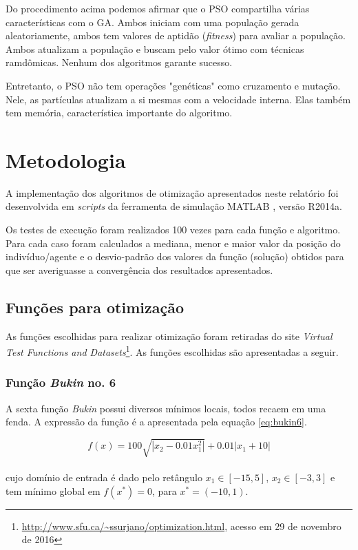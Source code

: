 \documentclass[a4paper,12pt]{article}
\begin{document}
Do procedimento acima podemos afirmar que o PSO compartilha várias características com o GA. Ambos iniciam com uma população gerada aleatoriamente, ambos tem valores de aptidão (\emph{fitness}) para avaliar a população. Ambos atualizam a população e buscam pelo valor ótimo com técnicas ramdômicas. Nenhum dos algoritmos garante sucesso.

Entretanto, o PSO não tem operações "genéticas" como cruzamento e mutação. Nele, as partículas atualizam a si mesmas com a velocidade interna. Elas também tem memória, característica importante do algoritmo.


\thispagestyle{main}

\section{Metodologia}

A implementação dos algoritmos de otimização apresentados neste relatório foi desenvolvida em \textit{scripts} da ferramenta de simulação MATLAB \cite{Moore:2012}, versão R2014a.

Os testes de execução foram realizados 100 vezes para cada função e algoritmo. Para cada caso foram calculados a mediana, menor e maior valor da posição do indivíduo/agente e o desvio-padrão dos valores da função (solução) obtidos para que ser averiguasse a convergência dos resultados apresentados.
 
\subsection{Funções para otimização}

As funções escolhidas para realizar otimização foram retiradas do site \textit{Virtual Test Functions and Datasets}\footnote{\url{ http://www.sfu.ca/~ssurjano/optimization.html}, acesso em 29 de novembro de 2016}. As funções escolhidas são apresentadas a seguir.


\subsubsection{Função \textit{Bukin} no. 6}

A sexta função \textit{Bukin} possui diversos mínimos locais, todos recaem em uma fenda. A expressão da função é a apresentada pela equação \ref{eq:bukin6}.

\begin{equation}
	f(x) = 100 \sqrt{|x_2 - 0.01x_1^2|} + 0.01 |x_1 + 10|
\label{eq:bukin6}
\end{equation}
\\
cujo domínio de entrada é dado pelo retângulo $x_1 \in [-15, 5]$, $x_2 \in [-3, 3]$ e tem mínimo global em $f(x^*) = 0$, para $x^* = (-10, 1)$.
\end{document}
